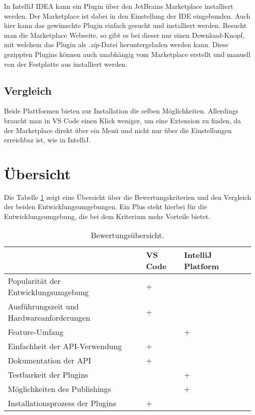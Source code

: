 In IntelliJ IDEA kann ein Plugin über den JetBrains Marketplace
installiert werden. Der Marketplace ist dabei in den Einstellung
der IDE eingebunden. Auch hier kann das gewünschte Plugin einfach
gesucht und installiert werden.
Besucht man die Marketplace Webseite, so gibt es bei dieser nur einen
Download-Knopf, mit welchem das Plugin als \emph{.zip}-Datei heruntergeladen
werden kann. Diese gezippten Plugins können auch
unabhängig vom Marketplace erstellt und manuell
von der Festplatte aus installiert werden.

\subsection{Vergleich}

Beide Plattformen bieten zur Installation die selben Möglichkeiten.
Allerdings braucht man in VS Code einen Klick weniger, um eine
Extension zu finden, da der Marketplace direkt über ein Menü
und nicht nur über die Einstellungen erreichbar ist, wie in IntelliJ.


\section{Übersicht}

Die Tabelle \ref{tab:Ueberblick_Kriterien} zeigt 
eine Übersicht über die Bewertungskriterien und den
Vergleich der beiden Entwicklungsumgebungen. 
Ein Plus steht hierbei für die Entwicklungsumgebung,
die bei dem Kriterium mehr Vorteile bietet.

\begin{table}[hb]
    \caption{Bewertungsübersicht.}
    \label{tab:Ueberblick_Kriterien}
    \centering
    \small %
    \setlength{\tabcolsep}{10pt} %
    \renewcommand{\arraystretch}{1.25} %

    \begin{tabular}{@{}llll@{}}
        \toprule
         & VS Code & IntelliJ Platform \\
        \midrule
        Popularität der Entwicklungsumgebung & + &  \\
        Ausführungszeit und Hardwareanforderungen & + &  \\
        Feature-Umfang &  & + \\
        Einfachheit der API-Verwendung & + &  \\
        Dokumentation der API & + &  \\
        Testbarkeit der Plugins &  & + \\
        Möglichkeiten des Publishings &  & + \\
        Installationsprozess der Plugins & + &  \\
        \bottomrule
    \end{tabular}
    
\end{table}